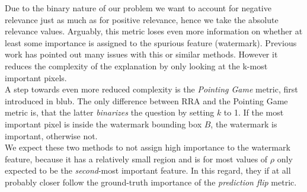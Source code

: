 Due to the binary nature of our problem we want to account for negative relevance just as much as for positive relevance, hence we take the absolute relevance values.
Arguably, this metric loses even more information on whether at least some importance is assigned to the spurious feature (watermark). Previous work has pointed out many issues with this or similar methods. However it reduces the complexity of the explanation by only looking at the k-most important pixels. \\

A step towards even more reduced complexity is the \textit{Pointing Game} metric, first introduced in blub. The only difference between RRA and the Pointing Game metric is, that the latter \textit{binarizes} the question by setting $k$ to 1. If the most important pixel is inside the watermark bounding box $B$, the watermark is important, otherwise not. \\

We expect these two methods to not assign high importance to the watermark feature, because it has a relatively small region and is for most values of $\rho$ only expected to be the \textit{second}-most important feature. In this regard, they if at all probably closer follow the ground-truth importance of the \textit{prediction flip} metric.

